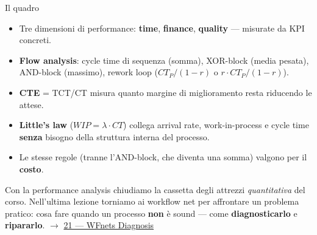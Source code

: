 \begin{boxabstract}{Il quadro}
\begin{itemize}
\item Tre dimensioni di performance: \textbf{time}, \textbf{finance}, \textbf{quality} — misurate da KPI concreti.
\item \textbf{Flow analysis}: cycle time di sequenza (somma), XOR-block (media pesata), AND-block (massimo), rework loop ($CT_P/(1-r)$ o $r\cdot CT_P/(1-r)$).
\item \textbf{CTE} = TCT/CT misura quanto margine di miglioramento resta riducendo le attese.
\item \textbf{Little's law} ($WIP = \lambda \cdot CT$) collega arrival rate, work-in-process e cycle time \textbf{senza} bisogno della struttura interna del processo.
\item Le stesse regole (tranne l'AND-block, che diventa una somma) valgono per il \textbf{costo}.
\end{itemize}
\end{boxabstract}

Con la performance analysis chiudiamo la cassetta degli attrezzi \emph{quantitativa} del corso. Nell'ultima lezione torniamo ai workflow net per affrontare un problema pratico: cosa fare quando un processo \textbf{non} è sound — come \textbf{diagnosticarlo} e \textbf{ripararlo}. $\rightarrow$ \hyperref[ch:21]{21 — WFnets Diagnosis}